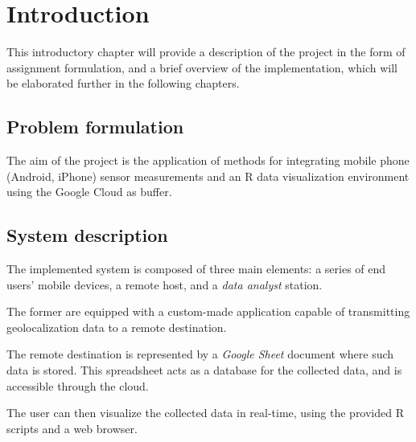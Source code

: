 \chapter{Introduction}
This introductory chapter will provide a description of the project in the form of assignment formulation, and a brief overview of the implementation, which will be elaborated further in the following chapters.

\section{Problem formulation}
The aim of the project is the application of methods for integrating mobile phone (Android, iPhone) sensor measurements and an R data visualization environment using the Google Cloud as buffer.

\section{System description}
The implemented system is composed of three main elements: a series of end users' mobile devices, a remote host, and a \emph{data analyst} station.

The former are equipped with a custom-made application capable of transmitting geolocalization data to a remote destination.

The remote destination is represented by a \emph{Google Sheet} document where such data is stored.
This spreadsheet acts as a database for the collected data, and is accessible through the cloud.

The user can then visualize the collected data in real-time, using the provided R scripts and a web browser.

